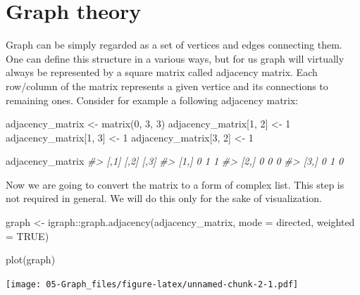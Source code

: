 \documentclass[
]{book}
\newenvironment{Shaded}{\begin{snugshade}}{\end{snugshade}}
\newcommand{\AttributeTok}[1]{\textcolor[rgb]{0.77,0.63,0.00}{#1}}
\newcommand{\CommentTok}[1]{\textcolor[rgb]{0.56,0.35,0.01}{\textit{#1}}}
\newcommand{\ConstantTok}[1]{\textcolor[rgb]{0.00,0.00,0.00}{#1}}
\newcommand{\DecValTok}[1]{\textcolor[rgb]{0.00,0.00,0.81}{#1}}
\newcommand{\FunctionTok}[1]{\textcolor[rgb]{0.00,0.00,0.00}{#1}}
\newcommand{\NormalTok}[1]{#1}
\newcommand{\OtherTok}[1]{\textcolor[rgb]{0.56,0.35,0.01}{#1}}
\newcommand{\SpecialCharTok}[1]{\textcolor[rgb]{0.00,0.00,0.00}{#1}}
\newcommand{\StringTok}[1]{\textcolor[rgb]{0.31,0.60,0.02}{#1}}
\begin{document}
\hypertarget{graph}{%
\chapter{Graph theory}\label{graph}}

Graph can be simply regarded as a set of vertices and edges connecting them. One can define this structure in a various ways, but for us graph will virtually always be represented by a square matrix called adjacency matrix. Each row/column of the matrix represents a given vertice and its connections to remaining ones. Consider for example a following adjacency matrix:

\begin{Shaded}
\begin{Highlighting}[]
\NormalTok{adjacency\_matrix }\OtherTok{\textless{}{-}} \FunctionTok{matrix}\NormalTok{(}\DecValTok{0}\NormalTok{, }\DecValTok{3}\NormalTok{, }\DecValTok{3}\NormalTok{)}
\NormalTok{adjacency\_matrix[}\DecValTok{1}\NormalTok{, }\DecValTok{2}\NormalTok{] }\OtherTok{\textless{}{-}} \DecValTok{1}
\NormalTok{adjacency\_matrix[}\DecValTok{1}\NormalTok{, }\DecValTok{3}\NormalTok{] }\OtherTok{\textless{}{-}} \DecValTok{1}
\NormalTok{adjacency\_matrix[}\DecValTok{3}\NormalTok{, }\DecValTok{2}\NormalTok{] }\OtherTok{\textless{}{-}} \DecValTok{1}

\NormalTok{adjacency\_matrix}
\CommentTok{\#\textgreater{}      [,1] [,2] [,3]}
\CommentTok{\#\textgreater{} [1,]    0    1    1}
\CommentTok{\#\textgreater{} [2,]    0    0    0}
\CommentTok{\#\textgreater{} [3,]    0    1    0}
\end{Highlighting}
\end{Shaded}

Now we are going to convert the matrix to a form of complex list. This step is not required in general. We will do this only for the sake of visualization.

\begin{Shaded}
\begin{Highlighting}[]
\NormalTok{graph }\OtherTok{\textless{}{-}}\NormalTok{ igraph}\SpecialCharTok{::}\FunctionTok{graph.adjacency}\NormalTok{(adjacency\_matrix, }\AttributeTok{mode =} \StringTok{\textquotesingle{}directed\textquotesingle{}}\NormalTok{, }\AttributeTok{weighted =} \ConstantTok{TRUE}\NormalTok{)}

\FunctionTok{plot}\NormalTok{(graph)}
\end{Highlighting}
\end{Shaded}

\texttt{[image: 05-Graph\_files/figure-latex/unnamed-chunk-2-1.pdf]}
\end{document}
